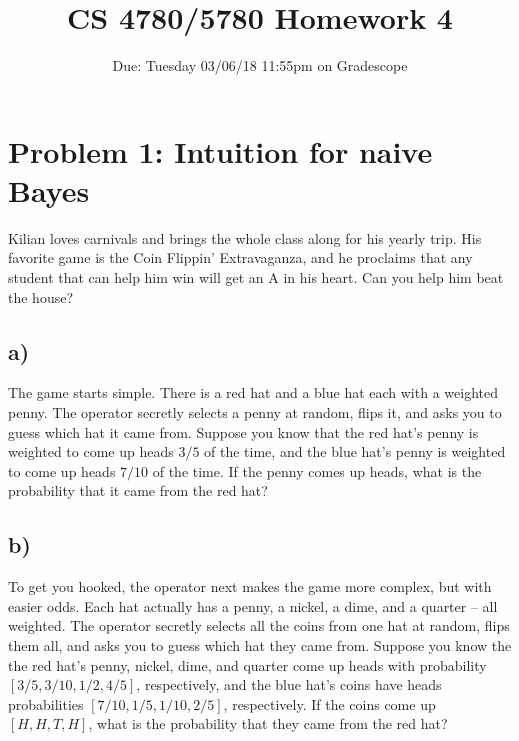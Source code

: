 \documentclass[a4paper]{article}
\title{CS 4780/5780 Homework 4\vspace{-10pt}}
\author{Due: Tuesday 03/06/18 11:55pm on Gradescope}
\date{\vspace{-20pt}}
\begin{document}
\maketitle

\section*{Problem 1: Intuition for naive Bayes}
Kilian loves carnivals and brings the whole class along for his yearly trip. His favorite game is the Coin Flippin' Extravaganza, and he proclaims that any student that can help him win will get an A in his heart. Can you help him beat the house?
\subsection*{a)}
The game starts simple. There is a red hat and a blue hat each with a weighted penny. The operator secretly selects a penny at random, flips it, and asks you to guess which hat it came from. Suppose you know that the red hat's penny is weighted to come up heads $3/5$ of the time, and the blue hat's penny is weighted to come up heads $7/10$ of the time. If the penny comes up heads, what is the probability that it came from the red hat?
\subsection*{b)}
To get you hooked, the operator next makes the game more complex, but with easier odds. Each hat actually has a penny, a nickel, a dime, and a quarter -- all weighted. The operator secretly selects all the coins from one hat at random, flips them all, and asks you to guess which hat they came from. Suppose you know the the red hat's penny, nickel, dime, and quarter come up heads with probability $[3/5, 3/10, 1/2, 4/5]$, respectively, and the blue hat's coins have heads probabilities $[7/10, 1/5, 1/10, 2/5]$, respectively. If the coins come up $[H,H,T,H]$, what is the probability that they came from the red hat?
\end{document}
